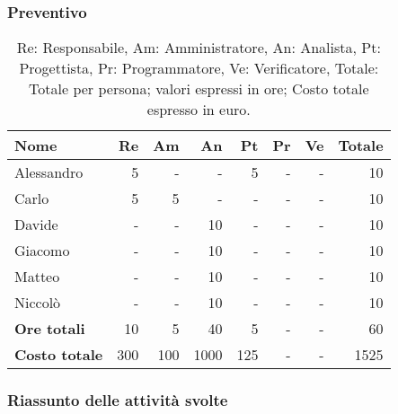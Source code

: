 \subsubsection{Preventivo}

\begin{table}[H]
	\centering
	\begin{tabular}{l|r|r|r|r|r|r|r}
		\textbf{Nome}         & \textbf{Re} & \textbf{Am} & \textbf{An} & \textbf{Pt} & \textbf{Pr} & \textbf{Ve} & \textbf{Totale} \\
		\hline
		Alessandro            & 5           & -           & -           & 5           & -           & -           & 10              \\
		Carlo                 & 5           & 5           & -           & -           & -           & -           & 10              \\
		Davide                & -           & -           & 10          & -           & -           & -           & 10              \\
		Giacomo               & -           & -           & 10          & -           & -           & -           & 10              \\
		Matteo                & -           & -           & 10          & -           & -           & -           & 10              \\
		Niccolò               & -           & -           & 10          & -           & -           & -           & 10              \\
		\hline
		\textbf{Ore totali}   & 10          & 5           & 40          & 5           & -           & -           & 60              \\
		\textbf{Costo totale} & 300         & 100         & 1000        & 125         & -           & -           & 1525
	\end{tabular}
	\caption{Re: Responsabile, Am: Amministratore, An: Analista, Pt: Progettista,
		Pr: Programmatore, Ve: Verificatore, Totale: Totale per persona; valori espressi in ore; Costo totale espresso in euro.}
\end{table}

\subsubsection{Riassunto delle attività svolte}

